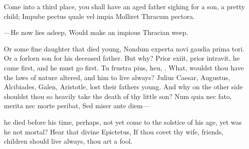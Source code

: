 {Come into a third place, you shall have an aged father sighing for a
son, a pretty child;
Impube pectus quale vel impia
Molliret Thracum pectora.

---He now lies asleep,
Would make an impious Thracian weep.

Or some fine daughter that died young, Nondum experta novi gaudia prima
tori. Or a forlorn son for his deceased father. But why? Prior exiit,
prior intravit, he came first, and he must go first. Tu frustra
pius, heu, \etc{}. What, wouldst thou have the laws of nature altered, and
him to live always? Julius Caesar, Augustus, Alcibiades, Galen,
Aristotle, lost their fathers young. And why on the other side shouldst
thou so heavily take the death of thy little son?
Num quia nec fato, merita nec morte peribat,
Sed miser ante diem---

he died before his time, perhaps, not yet come to the solstice of his
age, yet was he not mortal? Hear that divine Epictetus, If thou
covet thy wife, friends, children should live always, thou art a fool.

}
